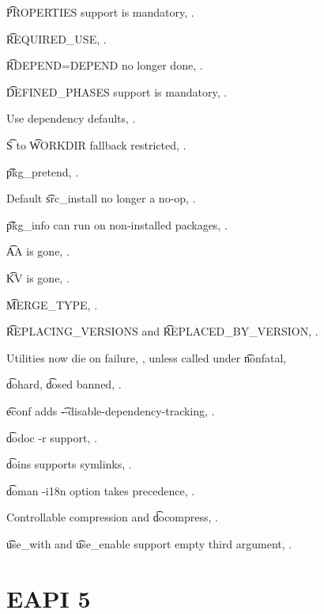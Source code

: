 \begin{compactitem}
\item \t{PROPERTIES} support is mandatory, .
\item \t{REQUIRED\_USE}, .
\item \t{RDEPEND=DEPEND} no longer done, .
\item \t{DEFINED\_PHASES} support is mandatory, .
\item Use dependency defaults, .
\item \t{S} to \t{WORKDIR} fallback restricted, .
\item \t{pkg\_pretend}, .
\item Default \t{src\_install} no longer a no-op, .
\item \t{pkg\_info} can run on non-installed packages, .
\item \t{AA} is gone, .
\item \t{KV} is gone, .
\item \t{MERGE\_TYPE}, .
\item \t{REPLACING\_VERSIONS} and \t{REPLACED\_BY\_VERSION}, .
\item Utilities now die on failure, , unless called under \t{nonfatal},
\item \t{dohard}, \t{dosed} banned, .
\item \t{econf} adds \t{-{}-disable-dependency-tracking}, .
\item \t{dodoc -r} support, .
\item \t{doins} supports symlinks, .
\item \t{doman -i18n} option takes precedence, .
\item Controllable compression and \t{docompress}, .
\item \t{use\_with} and \t{use\_enable} support empty third argument, .
\end{compactitem}

\section*{EAPI 5}


